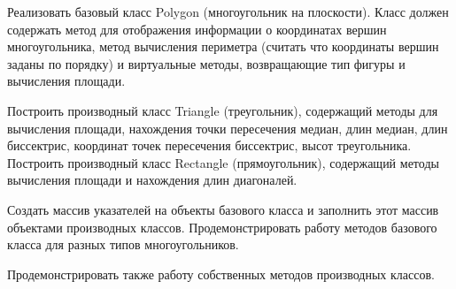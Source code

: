 Реализовать базовый класс Polygon (многоугольник на
		плоскости). Класс должен содержать метод для отображения
информации о координатах вершин многоугольника, метод
вычисления периметра (считать что координаты вершин
		заданы по порядку) и виртуальные методы, возвращающие
тип фигуры и вычисления площади.

Построить производный
класс Triangle (треугольник), содержащий методы для
вычисления площади, нахождения точки пересечения
медиан, длин медиан, длин биссектрис, координат точек
пересечения биссектрис, высот треугольника. Построить
производный класс Rectangle (прямоугольник), содержащий
методы вычисления площади и нахождения длин
диагоналей.

Создать массив указателей на объекты базового
класса и заполнить этот массив объектами производных
классов. Продемонстрировать работу методов базового
класса для разных типов многоугольников.

Продемонстрировать также работу собственных методов
производных классов.
